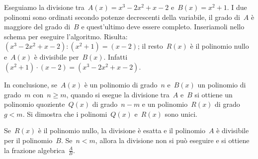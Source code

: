 \begin{exrig}
 \begin{esempio}
 Eseguiamo la divisione tra~$A(x)=x^{3}-2x^{2}+x-2$ e~$B(x)=x^{2}+1$.
I due polinomi sono ordinati secondo potenze decrescenti della variabile, il grado di~$A$ è maggiore del grado di~$B$ e quest'ultimo
deve essere completo. Inseriamoli nello schema per eseguire l'algoritmo. Risulta:
$\left(x^{3}-2x^{2}+x-2\right):\left(x^{2}+1\right)=(x-2)$; il resto~$R(x)$ è il polinomio nullo e~$A(x)$ è divisibile per~$B(x)$.
Infatti~$\left(x^{2}+1\right)\cdot (x-2)=\left(x^{3}-2x^{2}+x-2\right)$.
\begin{center}
 \vspace*{-1.10ex}
\end{center}
 \end{esempio}
\end{exrig}

In conclusione, se~$A(x)$ è un polinomio di grado~$n$ e~$B(x)$ un polinomio di grado~$m$ con~$n\ge m$, quando si esegue
la divisione tra~$A$ e~$B$ si ottiene un polinomio quoziente~$Q(x)$ di grado~$n-m$ e un polinomio~$R(x)$ di grado~$g<m$.
Si dimostra che i polinomi~$Q(x)$ e~$R(x)$ sono unici.

Se~$R(x)$ è il polinomio nullo, la divisione è esatta e il polinomio~$A$ è divisibile per il polinomio~$B$.
Se~$n<m$, allora la divisione non si può eseguire e si ottiene la frazione algebrica~$\frac{A}{B}$.

\vspazio\ovalbox{\risolvii \ref{ese:11.24}, \ref{ese:11.25}, \ref{ese:11.26}, \ref{ese:11.27}, \ref{ese:11.28}}

